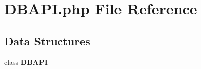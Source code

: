 \section{D\+B\+A\+P\+I.\+php File Reference}
\label{_d_b_a_p_i_8php}
\subsection*{Data Structures}
\begin{DoxyCompactItemize}
\item 
class {\bf D\+B\+A\+PI}
\end{DoxyCompactItemize}
